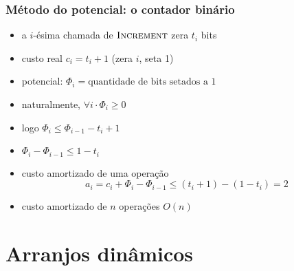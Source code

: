 \documentclass{beamer}
\begin{document}
\begin{frame}

\frametitle{Método do potencial: o contador binário}

\begin{itemize}

  \item a $i$-ésima chamada de $\textnormal{\scshape Increment}$ zera $t_i$ bits

  \item custo real $c_i = t_i + 1$ (zera $i$, seta 1)

  \item potencial: $\Phi_i = \text{quantidade de bits setados a 1}$

  \item naturalmente, $\forall i \cdot \Phi_i \ge 0$

  \item logo $\Phi_i \le \Phi_{i-1} - t_i + 1$

  \item $\Phi_i - \Phi_{i-1} \le 1 - t_i$

  \item custo amortizado de uma operação
    $$a_i = c_i + \Phi_i - \Phi_{i-1} \le (t_i + 1) - (1 - t_i) = 2$$

  \item custo amortizado de $n$ operações $O(n)$

\end{itemize}

\end{frame}

\section{Arranjos dinâmicos}
\end{document}
